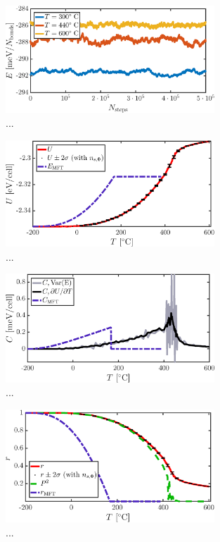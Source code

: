 \begin{figure}[!ht]
\begin{center}
  \includegraphics[width=0.7\textwidth]{../figures/equilibration} 
  \caption{... }
  \label{fig:T2:equil}
\end{center}
\end{figure}


\begin{figure}[!ht]
\begin{center}
  \includegraphics[width=0.7\textwidth]{../figures/U} 
  \caption{... }
  \label{fig:U}
\end{center}
\end{figure}

\begin{figure}[!ht]
\begin{center}
  \includegraphics[width=0.7\textwidth]{../figures/C} 
  \caption{... }
  \label{fig:C}
\end{center}
\end{figure}

\begin{figure}[!ht]
\begin{center}
  \includegraphics[width=0.7\textwidth]{../figures/r} 
  \caption{... }
  \label{fig:r}
\end{center}
\end{figure}

